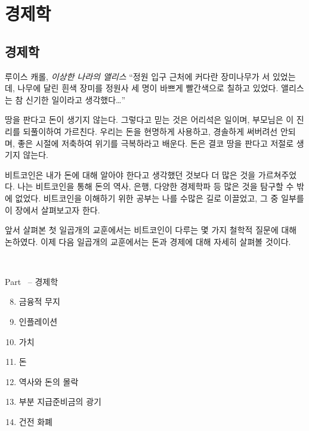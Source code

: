 \part{경제학}
\label{ch:economics}
\chapter*{경제학}

\begin{chapquote}{루이스 캐롤, \textit{이상한 나라의 앨리스}}
	\enquote{정원 입구 근처에 커다란 장미나무가 서 있었는데, 나무에 달린 흰색 장미를 정원사 세 명이 바쁘게 빨간색으로 칠하고 있었다.
		앨리스는 참 신기한 일이라고 생각했다\ldots}
\end{chapquote}

땅을 판다고 돈이 생기지 않는다. 그렇다고 믿는 것은 어리석은 일이며, 부모님은 이 진리를 되풀이하여 가르친다.
우리는 돈을 현명하게 사용하고, 경솔하게 써버려선 안되며, 좋은 시절에 저축하여 위기를 극복하라고 배운다. 
돈은 결코 땅을 판다고 저절로 생기지 않는다.

비트코인은 내가 돈에 대해 알아야 한다고 생각했던 것보다 더 많은 것을 가르쳐주었다. 
나는 비트코인을 통해 돈의 역사, 은행, 다양한 경제학파 등 많은 것을 탐구할 수 밖에 없었다.
비트코인을 이해하기 위한 공부는 나를 수많은 길로 이끌었고, 그 중 일부를 이 장에서 살펴보고자 한다. 

앞서 살펴본 첫 일곱개의 교훈에서는 비트코인이 다루는 몇 가지 철학적 질문에 대해 논하였다.
이제 다음 일곱개의 교훈에서는 돈과 경제에 대해 자세히 살펴볼 것이다. 

~

\begin{samepage}
	Part~\ref{ch:economics} -- 경제학
	
	\begin{enumerate}
		\setcounter{enumi}{7}
		\item 금융적 무지
		\item 인플레이션
		\item 가치
		\item 돈
		\item 역사와 돈의 몰락
		\item 부분 지급준비금의 광기
		\item 건전 화폐
\end{enumerate}
\end{samepage}


